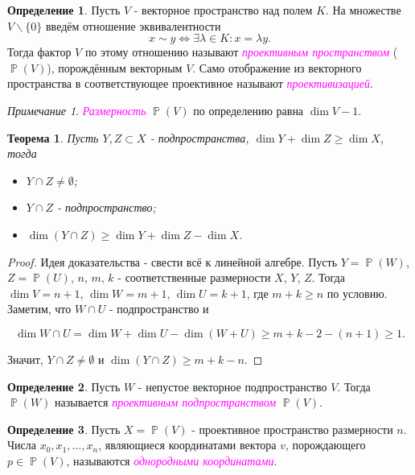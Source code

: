 \documentclass[a4paper,100pt]{article}
\theoremstyle{indented}
\newtheorem{theorem}{Теорема}
\theoremstyle{definition}
\newtheorem{defn}{Определение}
\theoremstyle{remark}
\newtheorem{remark}{Примечание}
\DeclareMathOperator{\Llra}{\Longleftrightarrow}
\DeclareMathOperator{\PP}{\mathbb{P}}
\begin{document}
\begin{defn}
    Пусть $V$ - векторное пространство над полем $K$. На множестве $V \backslash \{0\}$ введём отношение эквивалентности
    \[
        x \sim y \Llra \exists \lambda \in K: x = \lambda y. 
    \]
    Тогда фактор $V$ по этому отношению называют \textit{\textcolor{magenta}{\hypertarget{s32}{проективным пространством}}} ($\PP(V)$), порождённым векторным $V$. Само отображение из векторного пространства в соответствующее проективное называют \textit{\textcolor{magenta}{\hypertarget{s33}{проективизацией}}}.
\end{defn}

\begin{remark}
    \textit{\textcolor{magenta}{\hypertarget{s34}{Размерность}}} $\PP(V)$ по определению равна $\dim V -1$. 
\end{remark}

\begin{theorem}
    Пусть $Y, Z\subset X$ - подпространства, $\dim Y + \dim Z \geq \dim X$, тогда

    \begin{itemize}
        \item $Y\cap Z \neq \emptyset$; 
        \item $Y \cap Z$ - подпространство; 
        \item $\dim(Y \cap Z)\geq \dim Y + \dim Z - \dim X$. 
    \end{itemize}
\end{theorem}

\begin{proof}
    Идея доказательства - свести всё к линейной алгебре. Пусть $Y = \PP(W)$, $Z = \PP(U)$, $n$, $m$, $k$ - соответственные размерности $X$, $Y$, $Z$. Тогда $\dim V = n+1$, $\dim W = m+1$, $\dim U = k+1$, где $m+k \geq n$ по условию. Заметим, что $W \cap U$ - подпространство и 

    \[
        \dim{W \cap U} = \dim W + \dim U - \dim(W+U) \geq m+k-2 -(n+1) \geq 1.
    \]

    Значит, $Y \cap Z \neq \emptyset$ и $\dim(Y \cap Z) \geq m+k-n$. 
\end{proof}

\begin{defn}
    Пусть $W$ - непустое векторное подпространство $V$. Тогда $\PP(W)$ называется \textit{\textcolor{magenta}{\hypertarget{s35}{проективным подпространством}}} $\PP(V)$.
\end{defn}

\begin{defn}
    Пусть $X=\PP(V)$ - проективное пространство размерности $n$. Числа $x_0, x_1, \ldots, x_n$, являющиеся координатами вектора $v$, порождающего $p\in \PP(V)$, называются \textit{\textcolor{magenta}{\hypertarget{s36}{однородными координатами}}}.
\end{defn}
\end{document}
